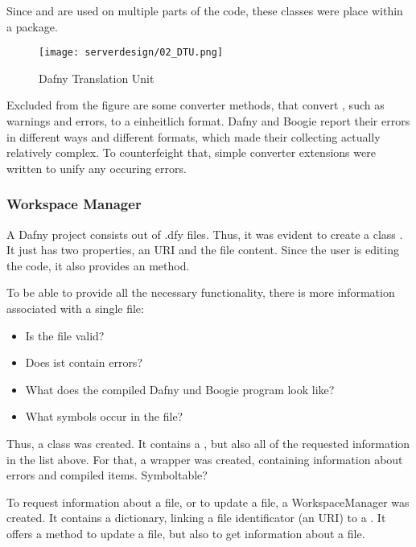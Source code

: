 Since  and  are used on multiple parts of the code, these classes were place within a  package.

\begin{figure}[H]
    \centering
    \texttt{[image: serverdesign/02\_DTU.png]}
    \caption{Dafny Translation Unit}
    \label{fig:server_dtu}
\end{figure}

Excluded from the figure are some converter methods, that convert , such as warnings and errors, to a einheitlich format. Dafny and Boogie report their errors in different ways and different formats, which made their collecting actually relatively complex. To counterfeight that, simple converter extensions were written to unify any occuring errors.



\subsubsection{Workspace Manager}
A Dafny project consists out of .dfy files. Thus, it was evident to create a class . It just has two properties, an URI and the file content. Since the user is editing the code, it also provides an  method.

To be able to provide all the necessary functionality, there is more information associated with a single file:
\begin{itemize}
    \item Is the file valid?
    \item Does ist contain errors?
    \item What does the compiled Dafny und Boogie program look like?
    \item What symbols occur in the file? 
\end{itemize}


Thus, a class  was created. It contains a , but also all of the requested information in the list above. For that, a wrapper  was created, containing information about errors and compiled items. Symboltable?

To request information about a file, or to update a file, a WorkspaceManager was created. It contains a dictionary, linking a file identificator (an URI) to a . It offers a method to update a file, but also to get information about a file.

